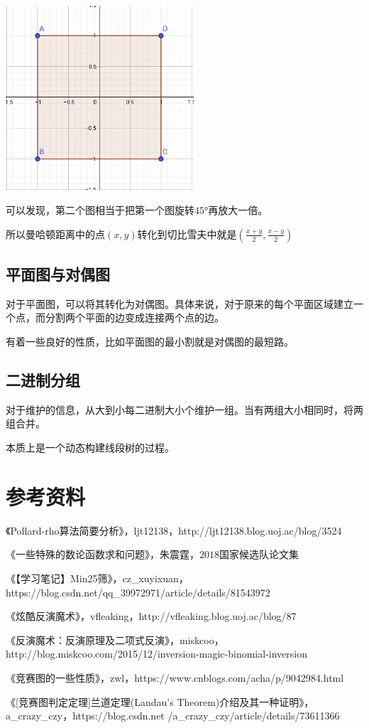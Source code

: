 \documentclass[UTF-8]{ctexart}
\begin{document}
\begin{center}
	\includegraphics[width=7cm]{file//qiebixuefu.png}
\end{center}

可以发现，第二个图相当于把第一个图旋转$45°$再放大一倍。  

所以曼哈顿距离中的点$(x,y)$转化到切比雪夫中就是$(\frac{x+y}{2},\frac{x-y}{2})$	
\subsection{平面图与对偶图}
对于平面图，可以将其转化为对偶图。具体来说，对于原来的每个平面区域建立一个点，而分割两个平面的边变成连接两个点的边。

有着一些良好的性质，比如平面图的最小割就是对偶图的最短路。
\subsection{二进制分组}
对于维护的信息，从大到小每二进制大小个维护一组。当有两组大小相同时，将两组合并。

本质上是一个动态构建线段树的过程。
	\section{参考资料}
	《Pollard-rho算法简要分析》，ljt12138，http://ljt12138.blog.uoj.ac/blog/3524
	
	《一些特殊的数论函数求和问题》，朱震霆，$2018$国家候选队论文集
	
	《【学习笔记】Min25筛》，cz\_xuyixuan，https://blog.csdn.net/qq\_39972971/article/details/81543972
	
	《炫酷反演魔术》，vfleaking，http://vfleaking.blog.uoj.ac/blog/87
	
	《反演魔术：反演原理及二项式反演》，miskcoo，http://blog.miskcoo.com/2015/12/inversion-magic-binomial-inversion
	
	《竞赛图的一些性质》，zwl，https://www.cnblogs.com/acha/p/9042984.html
	
	《[竞赛图判定定理]兰道定理(Landau's Theorem)介绍及其一种证明》，a\_crazy\_czy，https://blog.csdn.net /a\_crazy\_czy/article/details/73611366
\end{document}
